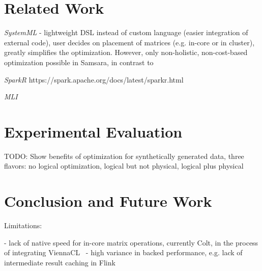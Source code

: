 \documentclass{article}
\begin{document}
\section{Related Work}

{\em SystemML} \cite{Ghoting2011} - lightweight DSL instead of custom language (easier integration of external code), user decides on placement of matrices (e.g. in-core or in cluster), greatly simplifies the optimization. However, only non-holistic, non-cost-based optimization possible in Samsara, in contrast to~\cite{Boehm2014}

{\em SparkR} https://spark.apache.org/docs/latest/sparkr.html

{\em MLI} \cite{Sparks2013}

\section{Experimental Evaluation}

TODO: Show benefits of optimization for synthetically generated data, three flavors: no logical optimization, logical but not physical, logical plus physical

\section{Conclusion and Future Work}

Limitations:

 - lack of native speed for in-core matrix operations, currently Colt, in the process of integrating ViennaCL~\cite{Tillet2013}
 - high variance in backed performance, e.g. lack of intermediate result caching in Flink



\end{document}
